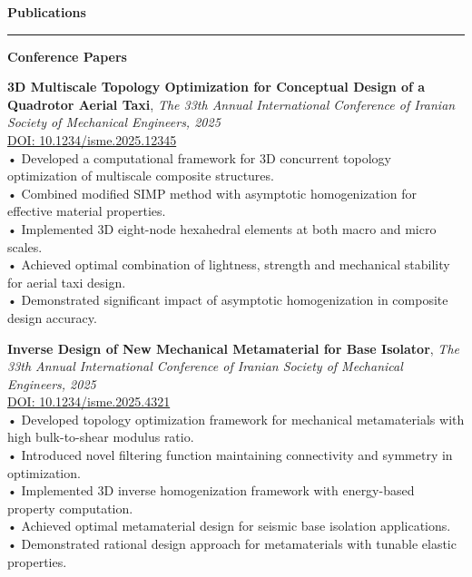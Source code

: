 \documentclass[11pt]{article}  %
\newenvironment{rSection}[1]{  %
    \vspace{0.5em}  %
    {\Large\bfseries\color{primary} #1}  %
    \vspace{0.3em}  %
    {\color{primary}\hrule height 2pt}  %
    \vspace{0.3em}  %
}{
    \vspace{0.05em}  %
}
\begin{document}
\begin{rSection}{Publications}
    {\color{primary}\textbf{Conference Papers}\par}
    \vspace{0.3em}
    
    \noindent\begin{minipage}{\textwidth}
        \textbf{3D Multiscale Topology Optimization for Conceptual Design of a Quadrotor Aerial Taxi}, \textit{\color{lighttext}The 33th Annual International Conference of Iranian Society of Mechanical Engineers, 2025}\\[0.3em]
        \href{https://doi.org/10.1234/isme.2025.12345}{\small\color{primary}DOI: 10.1234/isme.2025.12345}\\[0.3em]
        \small\color{lighttext}    • Developed a computational framework for 3D concurrent topology optimization of multiscale composite structures.\\
        \small\color{lighttext}    • Combined modified SIMP method with asymptotic homogenization for effective material properties.\\
        \small\color{lighttext}    • Implemented 3D eight-node hexahedral elements at both macro and micro scales.\\
        \small\color{lighttext}    • Achieved optimal combination of lightness, strength and mechanical stability for aerial taxi design.\\
        \small\color{lighttext}    • Demonstrated significant impact of asymptotic homogenization in composite design accuracy.
    \end{minipage}
    
    \vspace{1em}
    
    \noindent\begin{minipage}{\textwidth}
        \textbf{Inverse Design of New Mechanical Metamaterial for Base Isolator}, \textit{\color{lighttext}The 33th Annual International Conference of Iranian Society of Mechanical Engineers, 2025}\\[0.3em]
        \href{https://doi.org/10.1234/isme.2025.4321}{\small\color{primary}DOI: 10.1234/isme.2025.4321}\\[0.3em]
        \small\color{lighttext}    • Developed topology optimization framework for mechanical metamaterials with high bulk-to-shear modulus ratio.\\
        \small\color{lighttext}    • Introduced novel filtering function maintaining connectivity and symmetry in optimization.\\
        \small\color{lighttext}    • Implemented 3D inverse homogenization framework with energy-based property computation.\\
        \small\color{lighttext}    • Achieved optimal metamaterial design for seismic base isolation applications.\\
        \small\color{lighttext}    • Demonstrated rational design approach for metamaterials with tunable elastic properties.
    \end{minipage}
    

\end{rSection}
\end{document}
